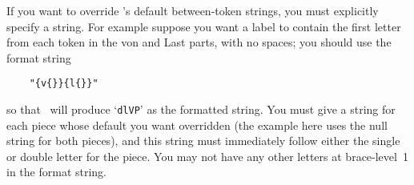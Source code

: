 If you want to override \BibTeX's default between-token strings, you
must explicitly specify a string.
For example suppose you want a label to contain the first letter from each
token in the von and Last parts, with no spaces;
you should use the format string
\begin{verbatim}
    "{v{}}{l{}}"
\end{verbatim}
so that \BibTeX\ will produce `{\tt dlVP}' as the formatted string.
You must give a string for each piece whose default you want overridden
(the example here uses the null string for both pieces), and this string
must immediately follow either the single or double letter for the piece.
You may not have any other letters at brace-level~1 in the format string.




